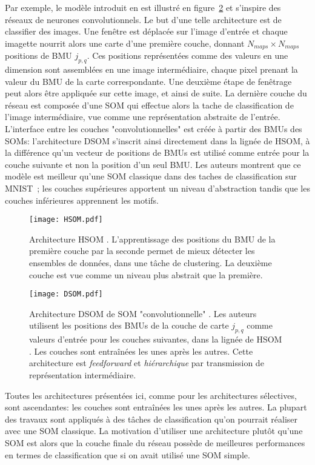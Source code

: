\documentclass[../main]{subfiles}
\begin{document}
Par exemple, le modèle introduit en \cite{Liu2015DeepSM} est illustré en figure~\ref{fig:dsom} et s'inspire des réseaux de neurones convolutionnels.
Le but d'une telle architecture est de classifier des images. Une fenêtre est déplacée sur l'image d'entrée et chaque imagette nourrit alors une carte d'une première couche, donnant $N_{maps}  \times N_{maps}$ positions de BMU $j_{p,q}$. Ces positions représentées comme des valeurs en une dimension sont assemblées en une image intermédiaire, chaque pixel prenant la valeur du BMU de la carte correspondante. Une deuxième étape de fenêtrage peut alors être appliquée sur cette image, et ainsi de suite. La dernière couche du réseau est composée d'une SOM qui effectue alors la tache de classification de l'image intermédiaire, vue comme une représentation abstraite  de l'entrée.
L'interface entre les couches "convolutionnelles" est créée à partir des BMUs des SOMs: l'architecture DSOM s'inscrit ainsi directement dans la lignée de HSOM, à la différence qu'un vecteur de positions de BMUs est utilisé comme entrée pour la couche suivante et non la position d'un seul BMU.
Les auteurs montrent que ce modèle est meilleur qu'une SOM classique dans des taches de classification sur MNIST~; les couches supérieures apportent un niveau d'abstraction tandis que les couches inférieures apprennent les motifs.

\begin{figure}
    \centering
    \texttt{[image: HSOM.pdf]}
    \caption{Architecture HSOM \cite{lampinen_clustering_1992}. L'apprentissage des positions du BMU de la première couche par la seconde permet de mieux détecter les ensembles de données, dans une tâche de clustering. La deuxième couche est vue comme un niveau plus abstrait que la première. \label{fig:hsom}}
\end{figure}

\begin{figure}
    \texttt{[image: DSOM.pdf]}
    \caption{Architecture DSOM de SOM "convolutionnelle" \cite{liu_deep_2015}. Les auteurs utilisent les positions des BMUs de la couche de carte $j_{p,q}$ comme valeurs d'entrée pour les couches suivantes, dans la lignée de HSOM \cite{lampinen_clustering_1992}. Les couches sont entraînées les unes après les autres. Cette architecture est \emph{feedforward} et \emph{hiérarchique} par transmission de représentation intermédiaire. \label{fig:dsom}}
\end{figure}

Toutes les architectures présentées ici, comme pour les architectures sélectives, sont ascendantes: les couches sont entraînées les unes après les autres. 
La plupart des travaux sont appliqués à des tâches de classification qu'on pourrait réaliser avec une SOM classique.
La motivation d'utiliser une architecture plutôt qu'une SOM est alors que la couche finale du réseau possède de meilleures performances en termes de classification que si on avait utilisé une SOM simple.
\end{document}

